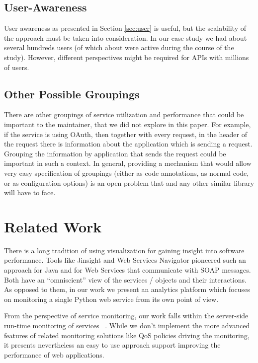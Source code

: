 \documentclass[conference]{IEEEtran}
\begin{document}
  \subsection{User-Awareness }

    User awareness as presented in Section \ref{sec:user} is useful, but the scalability of the approach must be taken into consideration. In our case study we had about several hundreds users (of which about \activeUserCount were active during the course of the study). However, different perspectives might be required for APIs with millions of users.


  \subsection{Other Possible Groupings}

    There are other groupings of service utilization and performance that could be important to the maintainer, that we did not explore in this paper. For example, if the service is using OAuth, then together with every request, in the header of the request there is information about the application which is sending a request. Grouping the information by application that sends the request could be important in such a context. In general, providing a mechanism that would allow very easy specification of groupings (either as code annotations, as normal code, or as configuration options) is an open problem that \tool and any other similar library will have to face.



\section{Related Work}
\label{sec:related}

There is a long tradition of using visualization for gaining insight into software performance. Tools like Jinsight \cite{Pauw02a} and Web Services Navigator \cite{Pauw05} pioneered such an approach for Java and for Web Services that communicate with SOAP messages. Both have an ``omniscient'' view of the services / objects and their interactions. As opposed to them, in our work we present an analytics platform which focuses on monitoring a single Python web service from its own point of view.

From the perspective of service monitoring, our work falls within the server-side run-time monitoring of services ~\cite{ghezzi2007run}. While we don't implement the more advanced features of related monitoring solutions like QoS policies driving the monitoring, it presents nevertheless an easy to use approach support improving the performance of web applications. 
\end{document}
